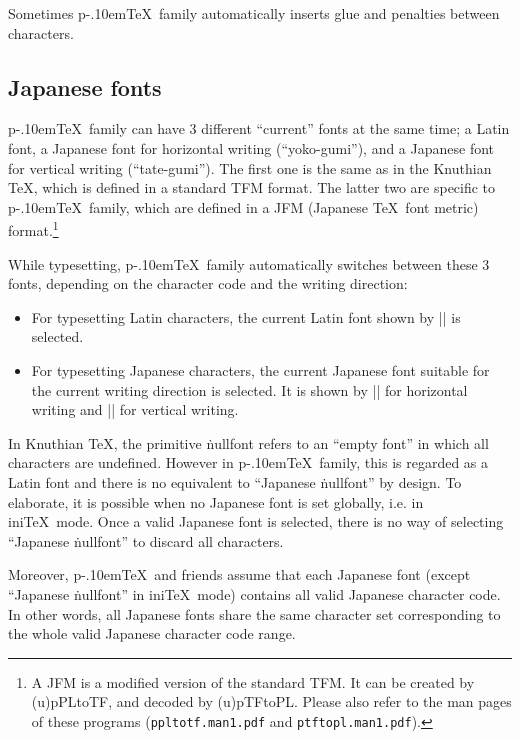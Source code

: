\documentclass[a4paper,11pt]{article}
\let\emph=\origemph
\def\code#1{\texttt{#1}}
\def\pTeX{p\kern-.10em\TeX}
\begin{document}
Sometimes \pTeX\ family automatically inserts glue and penalties
between characters.

\subsection{Japanese fonts}

\pTeX\ family can have 3 different ``current'' fonts at the same time;
a Latin font, a Japanese font for horizontal writing (``yoko-gumi''),
and a Japanese font for vertical writing (``tate-gumi'').
The first one is the same as in the Knuthian \TeX,
which is defined in a standard TFM format.
The latter two are specific to \pTeX\ family, which are defined
in a JFM (Japanese \TeX\ font metric) format.\footnote{%
A JFM is a modified version of the standard TFM.
It can be created by (u)pPLtoTF, and decoded by (u)pTFtoPL.
Please also refer to the man pages of these programs
(\code{ppltotf.man1.pdf} and \code{ptftopl.man1.pdf}).}

While typesetting, \pTeX\ family automatically switches between
these 3 fonts, depending on the character code and the writing direction:
\begin{itemize}
  \item For typesetting Latin characters,
    the current Latin font shown by |\the\font| is selected.
  \item For typesetting Japanese characters,
    the current Japanese font suitable for the current writing direction
    is selected. It is shown by |\the\jfont| for horizontal writing
    and |\the\tfont| for vertical writing.
\end{itemize}

In Knuthian \TeX, the primitive \.{nullfont} refers to an ``empty font''
in which all characters are undefined.
However in \pTeX\ family, this is regarded as a Latin font
and there is no equivalent to ``Japanese \.{nullfont}'' by design.
To elaborate, it is possible \emph{only} when no Japanese font is
set globally, i.e. in ini\TeX\ mode.
Once a valid Japanese font is selected, there is no way of
selecting ``Japanese \.{nullfont}'' to discard all characters.

Moreover, \pTeX\ and friends assume that each Japanese font
(except ``Japanese \.{nullfont}'' in ini\TeX\ mode)
contains all valid Japanese character code.
In other words, all Japanese fonts share the same character set
corresponding to the whole valid Japanese character code range.\label{jfont}
\end{document}
